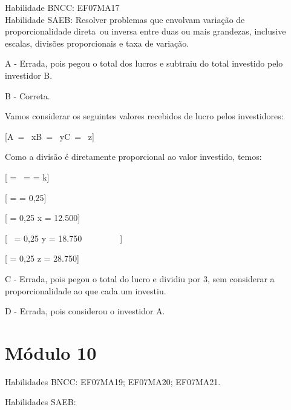 Habilidade BNCC: EF07MA17\\
Habilidade SAEB: Resolver problemas que envolvam variação de
proporcionalidade direta~ou inversa entre duas ou mais grandezas,
inclusive escalas, divisões proporcionais e taxa de variação.

A - Errada, pois pegou o total dos lucros e subtraiu do total investido
pelo investidor B.

B - Correta.

Vamos considerar os seguintes valores recebidos de lucro pelos
investidores:

[A\  = \ x\text{\ \ \ \ \ \ \ \ \ \ \ \ \ \ \ \ \ \ \ \ }B\  = \ y\text{\ \ \ \ \ \ \ \ \ \ \ \ \ \ \ \ \ \ \ \ }C\  = \ z]

Como a divisão é diretamente proporcional ao valor investido, temos:

[ = \  =  = k]

[ =  = 0,25]

[ = 0,25 \rightarrow x = 12.500]

[\  = 0,25 \rightarrow y = 18.750\ \ \ \ \ \ \ \ \ ]

[ = 0,25 \rightarrow z = 28.750]

C - Errada, pois pegou o total do lucro e dividiu por 3, sem considerar
a proporcionalidade ao que cada um investiu.

D - Errada, pois considerou o investidor A.

\section{Módulo 10}

Habilidades BNCC: EF07MA19; EF07MA20; EF07MA21.

Habilidades SAEB:

